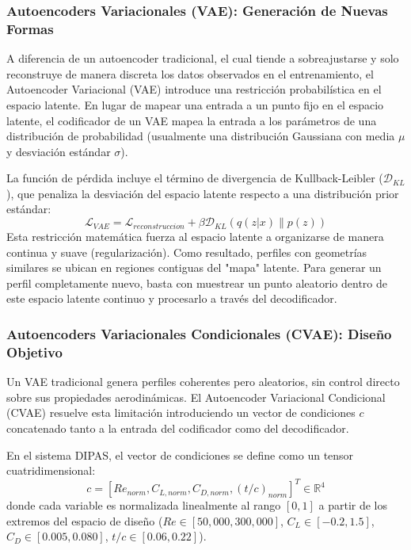 \subsubsection{Autoencoders Variacionales (VAE): Generación de Nuevas Formas}
A diferencia de un autoencoder tradicional, el cual tiende a sobreajustarse y solo reconstruye de manera discreta los datos observados en el entrenamiento, el Autoencoder Variacional (VAE) introduce una restricción probabilística en el espacio latente. En lugar de mapear una entrada a un punto fijo en el espacio latente, el codificador de un VAE mapea la entrada a los parámetros de una distribución de probabilidad (usualmente una distribución Gaussiana con media $\mu$ y desviación estándar $\sigma$).

La función de pérdida incluye el término de divergencia de Kullback-Leibler ($\mathcal{D}_{KL}$), que penaliza la desviación del espacio latente respecto a una distribución prior estándar:
\begin{equation}
    \mathcal{L}_{VAE} = \mathcal{L}_{reconstruccion} + \beta \mathcal{D}_{KL}(q(z|x) \parallel p(z))
\end{equation}
Esta restricción matemática fuerza al espacio latente a organizarse de manera continua y suave (regularización). Como resultado, perfiles con geometrías similares se ubican en regiones contiguas del "mapa" latente. Para generar un perfil completamente nuevo, basta con muestrear un punto aleatorio dentro de este espacio latente continuo y procesarlo a través del decodificador.

\subsubsection{Autoencoders Variacionales Condicionales (CVAE): Diseño Objetivo}
Un VAE tradicional genera perfiles coherentes pero aleatorios, sin control directo sobre sus propiedades aerodinámicas. El Autoencoder Variacional Condicional (CVAE) \cite{wang2025cvae} resuelve esta limitación introduciendo un vector de condiciones $c$ concatenado tanto a la entrada del codificador como del decodificador.

En el sistema DIPAS, el vector de condiciones se define como un tensor cuatridimensional:
\begin{equation}
    c = \left[ Re_{norm}, C_{L,norm}, C_{D,norm}, (t/c)_{norm} \right]^T \in \mathbb{R}^4
\end{equation}
donde cada variable es normalizada linealmente al rango $[0, 1]$ a partir de los extremos del espacio de diseño ($Re \in [50{,}000, 300{,}000]$, $C_L \in [-0.2, 1.5]$, $C_D \in [0.005, 0.080]$, $t/c \in [0.06, 0.22]$).


